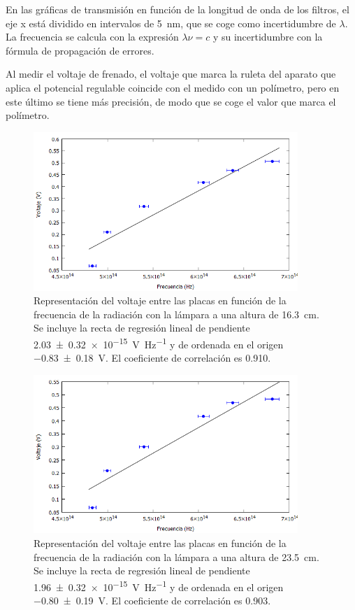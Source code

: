 \documentclass[12pt]{article}
\numberwithin{table}{section}
\numberwithin{figure}{section}
\numberwithin{equation}{section}
\newcommand{\data}[3]{\SI{#1 \pm #2}{#3}}
\begin{document}
En las gráficas de transmisión en función de la longitud de onda de los filtros, el eje x está dividido en intervalos de \SI{5}{nm}, que se coge como incertidumbre de $\lambda$. La frecuencia se calcula con la expresión $\lambda\nu=c$ y su incertidumbre con la fórmula de propagación de errores.

Al medir el voltaje de frenado, el voltaje que marca la ruleta del aparato que aplica el potencial regulable coincide con el medido con un polímetro, pero en este último se tiene más precisión, de modo que se coge el valor que marca el polímetro.
\begin{figure}[!ht]
	\begin{center}
		\includegraphics[width=10cm]{P1016,3cm.png}
		\caption{Representación del voltaje entre las placas en función de la frecuencia de la radiación con la lámpara a una altura de \SI{16.3}{cm}. Se incluye la recta de regresión lineal de pendiente \data{2.03}{0.32e-15}{V Hz^{-1}} y de ordenada en el origen \data{-0.83}{0.18}{V}. El coeficiente de correlación es \num{0.910}.}
		\label{P1016,3cm}
	\end{center}
\end{figure}
\begin{figure}[!ht]
	\begin{center}
		\includegraphics[width=10cm]{P1023,5cm.png}
		\caption{Representación del voltaje entre las placas en función de la frecuencia de la radiación con la lámpara a una altura de \SI{23.5}{cm}. Se incluye la recta de regresión lineal de pendiente \data{1.96}{0.32e-15}{V Hz^{-1}} y de ordenada en el origen \data{-0.80}{0.19}{V}. El coeficiente de correlación es \num{0.903}.}
		\label{P1023,5cm}
	\end{center}
\end{figure}
\end{document}
